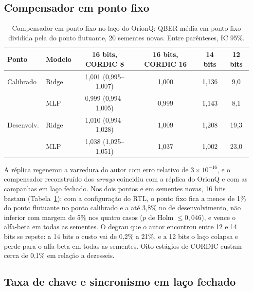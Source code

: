 \documentclass[12pt]{article}
\begin{document}
\subsection{Compensador em ponto fixo}
\label{sec:quant}

\begin{table}[ht]
\centering
\caption{Compensador em ponto fixo no laço do OrionQ: QBER média em ponto fixo
dividida pela do ponto flutuante, 20 sementes novas. Entre parênteses, IC 95\%.}
\label{tab:quant}
\small
\begin{tabular}{llcccc}
\toprule
Ponto & Modelo & 16 bits, CORDIC 8 & 16 bits, CORDIC 16 & 14 bits & 12 bits \\
\midrule
Calibrado & Ridge & 1,001 (0,995--1,007) & 1,000 & 1,136 & 9,0 \\
 & MLP & 0,999 (0,994--1,005) & 0,999 & 1,143 & 8,1 \\
Desenvolv. & Ridge & 1,010 (0,994--1,028) & 1,009 & 1,208 & 19,3 \\
 & MLP & 1,038 (1,025--1,051) & 1,037 & 1,002 & 23,0 \\
\bottomrule
\end{tabular}
\end{table}

A réplica regenerou a varredura do autor com erro relativo de $3\times10^{-16}$, e
o compensador reconstruído dos \textit{arrays} coincidiu com a réplica do OrionQ e
com as campanhas em laço fechado. Nos dois pontos e em sementes novas, 16 bits
bastam (Tabela~\ref{tab:quant}): com a configuração do RTL, o ponto fixo fica a
menos de 1\% do ponto flutuante no ponto calibrado e a até 3,8\% no de
desenvolvimento, não inferior com margem de 5\% nos quatro casos ($p$ de Holm
$\leq 0{,}046$), e vence o alfa-beta em todas as sementes. O degrau que o autor
encontrou entre 12 e 14 bits se repete: a 14 bits o custo vai de 0,2\% a 21\%, e
a 12 bits o laço colapsa e perde para o alfa-beta em todas as sementes. Oito
estágios de CORDIC custam cerca de 0,1\% em relação a dezesseis.

\subsection{Taxa de chave e sincronismo em laço fechado}
\end{document}
